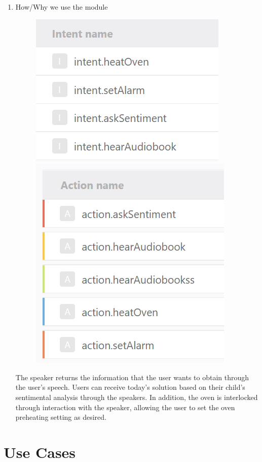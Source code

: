 \documentclass[conference]{IEEEtran}
\begin{document}
\begin{enumerate}
\begin{enumerate}
            \item How/Why we use the module
            \begin{figure}[H]
            \centering
            \includegraphics[scale=0.5]{new_assets/nugu_intent.png}
            \includegraphics[scale=0.5]{new_assets/nugu_action.png}
            \end{figure}
            The speaker returns the information that the user wants to obtain through the user's speech. Users can receive today's solution based on their child's sentimental analysis through the speakers. In addition, the oven is interlocked through interaction with the speaker, allowing the user to set the oven preheating setting as desired.
            
        \end{enumerate}
\end{enumerate}
\clearpage
\section{\large{Use Cases}}
\end{document}
